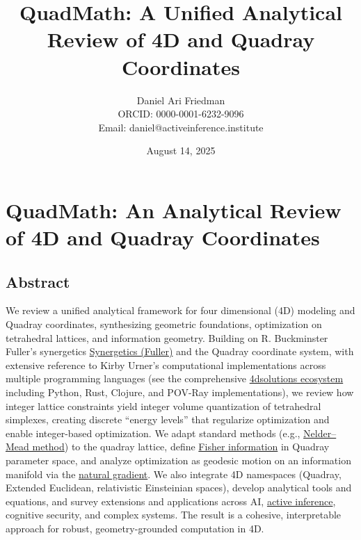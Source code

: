 \documentclass[
  10pt,
]{article}
\title{QuadMath: A Unified Analytical Review of 4D and Quadray Coordinates}
\author{Daniel Ari Friedman\\ ORCID: 0000-0001-6232-9096\\ Email: daniel@activeinference.institute}
\date{August 14, 2025}
\begin{document}
\maketitle

{
\hypersetup{linkcolor=red}
\setcounter{tocdepth}{3}
\tableofcontents
}
\hypertarget{quadmath-an-analytical-review-of-4d-and-quadray-coordinates}{%
\section{QuadMath: An Analytical Review of 4D and Quadray
Coordinates}\label{quadmath-an-analytical-review-of-4d-and-quadray-coordinates}}

\hypertarget{abstract}{%
\subsection{Abstract}\label{abstract}}

We review a unified analytical framework for four dimensional (4D)
modeling and Quadray coordinates, synthesizing geometric foundations,
optimization on tetrahedral lattices, and information geometry. Building
on R. Buckminster Fuller's synergetics
\href{https://en.wikipedia.org/wiki/Synergetics_(Fuller)}{Synergetics
(Fuller)} and the Quadray coordinate system, with extensive reference to
Kirby Urner's computational implementations across multiple programming
languages (see the comprehensive
\href{https://github.com/4dsolutions}{4dsolutions ecosystem} including
Python, Rust, Clojure, and POV-Ray implementations), we review how
integer lattice constraints yield integer volume quantization of
tetrahedral simplexes, creating discrete ``energy levels'' that
regularize optimization and enable integer-based optimization. We adapt
standard methods (e.g.,
\href{https://en.wikipedia.org/wiki/Nelder\%E2\%80\%93Mead_method}{Nelder--Mead
method}) to the quadray lattice, define
\href{https://en.wikipedia.org/wiki/Fisher_information}{Fisher
information} in Quadray parameter space, and analyze optimization as
geodesic motion on an information manifold via the
\href{https://en.wikipedia.org/wiki/Natural_gradient}{natural gradient}.
We also integrate 4D namespaces (Quadray, Extended Euclidean,
relativistic Einsteinian spaces), develop analytical tools and
equations, and survey extensions and applications across AI,
\href{https://welcome.activeinference.institute/}{active inference},
cognitive security, and complex systems. The result is a cohesive,
interpretable approach for robust, geometry-grounded computation in 4D.
\end{document}
